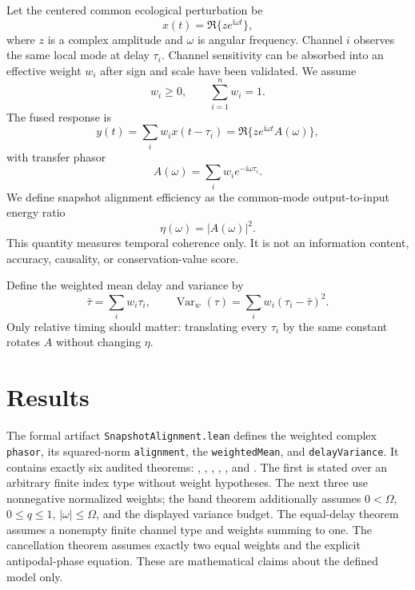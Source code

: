 \documentclass[10pt]{article}
\newcommand{\Var}{\operatorname{Var}}
\begin{document}
Let the centered common ecological perturbation be
\begin{equation}
x(t)=\Re\{z e^{\mathrm{i}\omega t}\},
\label{eq:mode}
\end{equation}
where $z$ is a complex amplitude and $\omega$ is angular frequency.  Channel
$i$ observes the same local mode at delay $\tau_i$.  Channel sensitivity can be
absorbed into an effective weight $w_i$ after sign and scale have been validated.
We assume
\begin{equation}
w_i\ge0, \qquad \sum_{i=1}^n w_i=1.
\label{eq:weights}
\end{equation}
The fused response is
\begin{equation}
y(t)=\sum_i w_i x(t-\tau_i)
=\Re\{z e^{\mathrm{i}\omega t}A(\omega)\},
\end{equation}
with transfer phasor
\begin{equation}
A(\omega)=\sum_i w_i e^{-\mathrm{i}\omega\tau_i}.
\label{eq:phasor}
\end{equation}
We define snapshot alignment efficiency as the common-mode output-to-input
energy ratio
\begin{equation}
\eta(\omega)=|A(\omega)|^2.
\label{eq:eta}
\end{equation}
This quantity measures temporal coherence only.  It is not an information
content, accuracy, causality, or conservation-value score.

Define the weighted mean delay and variance by
\begin{equation}
\bar\tau=\sum_i w_i\tau_i, \qquad
\Var_w(\tau)=\sum_i w_i(\tau_i-\bar\tau)^2.
\label{eq:variance}
\end{equation}
Only relative timing should matter: translating every $\tau_i$ by the same
constant rotates $A$ without changing $\eta$.

\section{Results}

The formal artifact \texttt{SnapshotAlignment.lean} defines the weighted
complex \texttt{phasor}, its squared-norm \texttt{alignment}, the
\texttt{weightedMean}, and \texttt{delayVariance}.  It contains exactly six
audited theorems: ,
,
,
,
, and
.  The first is stated over
an arbitrary finite index type without weight hypotheses.  The next three use
nonnegative normalized weights; the band theorem additionally assumes
$0<\Omega$, $0\le q\le1$, $|\omega|\le\Omega$, and the displayed variance
budget.  The equal-delay theorem assumes a nonempty finite channel type and
weights summing to one.  The cancellation theorem assumes exactly two equal
weights and the explicit antipodal-phase equation.  These are mathematical
claims about the defined model only.
\end{document}

